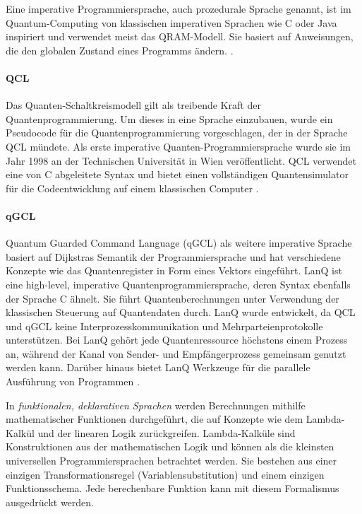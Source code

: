 \begin{defn}
\label{def:imperative-prog-lang}
Eine imperative Programmiersprache, auch prozedurale Sprache genannt, ist im Quantum-Computing von klassischen imperativen Sprachen wie C oder Java inspiriert und verwendet meist das QRAM-Modell. Sie basiert auf Anweisungen, die den globalen Zustand eines Programms ändern. \autocite{garhwal_quantum_2021}. 
\end{defn}

\paragraph{QCL} Das Quanten-Schaltkreismodell gilt als treibende Kraft der Quantenprogrammierung. Um dieses in eine Sprache einzubauen, wurde ein Pseudocode für die Quantenprogrammierung vorgeschlagen, der in der Sprache QCL mündete. Als erste imperative Quanten-Programmiersprache wurde sie im Jahr 1998 an der Technischen Universität in Wien veröffentlicht. QCL verwendet eine von C abgeleitete Syntax und bietet einen vollständigen Quantensimulator für die Codeentwicklung auf einem klassischen Computer \autocite{sofgeSurveyQuantumProgramming2008a}.

\paragraph{qGCL} Quantum Guarded Command Language (qGCL) als weitere imperative Sprache basiert auf Dijkstras Semantik der Programmiersprache und hat verschiedene Konzepte wie das Quantenregister in Form eines Vektors eingeführt. LanQ ist eine high-level, imperative Quantenprogrammiersprache, deren Syntax ebenfalls der Sprache C ähnelt. Sie führt Quantenberechnungen unter Verwendung der klassischen Steuerung auf Quantendaten durch. LanQ wurde entwickelt, da QCL und qGCL keine Interprozesskommunikation und Mehrparteienprotokolle unterstützen. Bei LanQ gehört jede Quantenressource höchstens einem Prozess an, während der Kanal von Sender- und Empfängerprozess gemeinsam genutzt werden kann. Darüber hinaus bietet LanQ Werkzeuge für die parallele Ausführung von Programmen \autocite{garhwal_quantum_2021}.

In \textit{funktionalen, deklarativen Sprachen} werden Berechnungen mithilfe mathematischer Funktionen durchgeführt, die auf Konzepte wie dem Lambda-Kalkül und der linearen Logik zurückgreifen. Lambda-Kalküle sind Konstruktionen aus der mathematischen Logik und können als die kleinsten universellen Programmiersprachen betrachtet werden. Sie bestehen aus einer einzigen Transformationsregel (Variablensubstitution) und einem einzigen Funktionsschema. Jede berechenbare Funktion kann mit diesem Formalismus ausgedrückt werden. \autocite{garhwal_quantum_2021}

